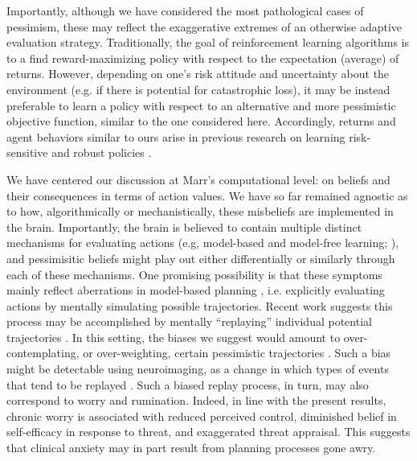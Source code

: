 \documentclass[11pt]{article} %
\begin{document}
Importantly, although we have considered the most pathological cases of pessimism, these may reflect the exaggerative extremes of an otherwise adaptive evaluation strategy. Traditionally, the goal of reinforcement learning algorithms is to a find reward-maximizing policy with respect to the expectation (average) of returns. However, depending on one's risk attitude and uncertainty about the environment (e.g. if there is potential for catastrophic loss), it may be instead preferable to learn a policy with respect to an alternative and more pessimistic objective function, similar to the one considered here. Accordingly, returns and agent behaviors similar to ours arise in previous research on learning risk-sensitive and robust policies \cite{morimura2012, chow2015, bellemare2017}. 

We have centered our discussion at Marr's \cite{marr1982} computational level: on beliefs and their consequences in terms of action values. We have so far remained agnostic as to how, algorithmically or mechanistically, these misbeliefs are implemented in the brain. \cite{friston2014computational} Importantly, the brain is believed to contain multiple distinct mechanisms for evaluating actions (e.g, model-based and model-free learning; \cite{daw2005, huys2015}), and pessimisitic beliefs might play out either differentially or similarly through each of these mechanisms. One promising possibility is that these symptoms mainly reflect aberrations in model-based planning \cite{huys2015}, i.e. explicitly evaluating actions by mentally simulating possible trajectories. Recent work suggests this process may be accomplished by mentally ``replaying'' individual potential trajectories \cite{momennejad_offline_2018,mattar2018}. In this setting, the biases we suggest would amount to over-contemplating, or over-weighting, certain pessimistic trajectories \cite{hunter2019}. Such a bias might be detectable using neuroimaging, as a change in which types of events that tend to be replayed \cite{momennejad_offline_2018, ambrose2016}. Such a biased replay process, in turn, may also correspond to worry and rumination. Indeed, in line with the present results, chronic worry is associated with reduced perceived control, diminished belief in self-efficacy in response to threat, and exaggerated threat appraisal\cite{Berenbaum2010}. This suggests that clinical anxiety may in part result from planning processes gone awry. 
\end{document}
